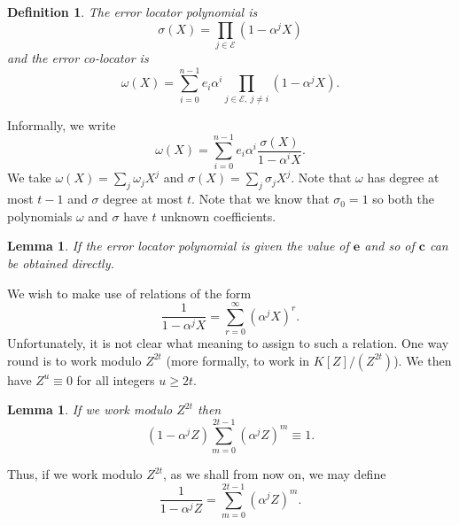 \documentclass[12pt,a4paper]{article}
\theoremstyle{plain}
\newtheorem{lemma}[theorem]{Lemma}
\newtheorem{definition}[theorem]{Definition}
\theoremstyle{definition}
\begin{document}
    \begin{definition}
        The \emph{error locator polynomial} is
        \[\sigma(X)=\prod_{j\in{\mathcal E}}(1-\alpha^{j}X)\]
        and the \emph{error co-locator} is
        \[\omega(X)=\sum_{i=0}^{n-1}e_{i}\alpha^{i}
        \prod_{j\in{\mathcal E},\ j\neq i}(1-\alpha^{j}X).\]
    \end{definition}
    \noindent
    Informally, we write
    \[\omega(X)=\sum_{i=0}^{n-1}e_{i}\alpha^{i}
    \frac{\sigma(X)}{1-\alpha^{i}X}.\]
    We take $\omega(X)=\sum_{j}\omega_{j}X^{j}$ and
    $\sigma(X)=\sum_{j}\sigma_{j}X^{j}$. Note that
    $\omega$ has degree at most $t-1$ and $\sigma$
    degree at most $t$. Note that we know that
    $\sigma_{0}=1$ so both the polynomials
    $\omega$ and $\sigma$ have $t$ unknown coefficients.
    \begin{lemma}
        If the error locator polynomial
        is given the value of ${\mathbf e}$ and so of ${\mathbf c}$
        can be obtained directly.
    \end{lemma}


    We wish to make use of relations of the form
    \[\frac{1}{1-\alpha^{j}X}=\sum_{r=0}^{\infty}(\alpha^{j}X)^{r}.\]
    Unfortunately, it is not clear what meaning to assign
    to such a relation. One way round is to work modulo $Z^{2t}$
    (more formally, to work in $K[Z]/(Z^{2t})$). We then
    have $Z^{u}\equiv 0$ for all integers $u\geq 2t$.
    \begin{lemma}
        If we work modulo $Z^{2t}$ then
        \[(1-\alpha^{j}Z)\sum_{m=0}^{2t-1}(\alpha^{j}Z)^{m}\equiv 1.\]
    \end{lemma}
    Thus, if we work modulo
    $Z^{2t}$, as we shall from now on,
    we may define
    \[\frac{1}{1-\alpha^{j}Z}=\sum_{m=0}^{2t-1}(\alpha^{j}Z)^{m}.\]
\end{document}
